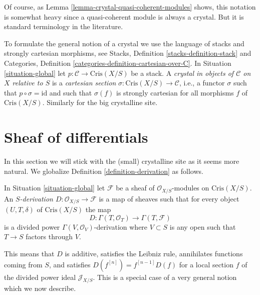 \noindent
Of course, as Lemma \ref{lemma-crystal-quasi-coherent-modules} shows, this
notation is somewhat heavy since a quasi-coherent module is always a crystal.
But it is standard terminology in the literature.

\begin{remark}
\label{remark-crystal}
To formulate the general notion of a crystal we use the language
of stacks and strongly cartesian morphisms, see
Stacks, Definition \ref{stacks-definition-stack} and
Categories, Definition \ref{categories-definition-cartesian-over-C}.
In Situation \ref{situation-global} let
$p : \mathcal{C} \to \text{Cris}(X/S)$ be a stack.
A {\it crystal in objects of $\mathcal{C}$ on $X$ relative to $S$}
is a {\it cartesian section} $\sigma : \text{Cris}(X/S) \to \mathcal{C}$,
i.e., a functor $\sigma$ such that $p \circ \sigma = \text{id}$
and such that $\sigma(f)$ is strongly cartesian for all
morphisms $f$ of $\text{Cris}(X/S)$. Similarly for the big crystalline site.
\end{remark}





\section{Sheaf of differentials}
\label{section-differentials-sheaf}

\noindent
In this section we will stick with the (small) crystalline site
as it seems more natural. We globalize
Definition \ref{definition-derivation} as follows.

\begin{definition}
\label{definition-global-derivation}
In Situation \ref{situation-global} let
$\mathcal{F}$ be a sheaf of $\mathcal{O}_{X/S}$-modules on
$\text{Cris}(X/S)$. An
{\it $S$-derivation $D : \mathcal{O}_{X/S} \to \mathcal{F}$}
is a map of sheaves such that for every object $(U, T, \delta)$ of
$\text{Cris}(X/S)$ the map
$$
D : \Gamma(T, \mathcal{O}_T) \longrightarrow \Gamma(T, \mathcal{F})
$$
is a divided power $\Gamma(V, \mathcal{O}_V)$-derivation where $V \subset S$
is any open such that $T \to S$ factors through $V$.
\end{definition}

\noindent
This means that $D$ is additive, satisfies the Leibniz rule, annihilates
functions coming from $S$, and satisfies $D(f^{[n]}) = f^{[n - 1]}D(f)$
for a local section $f$ of the divided power ideal $\mathcal{J}_{X/S}$.
This is a special case of a very general notion which we now describe.

